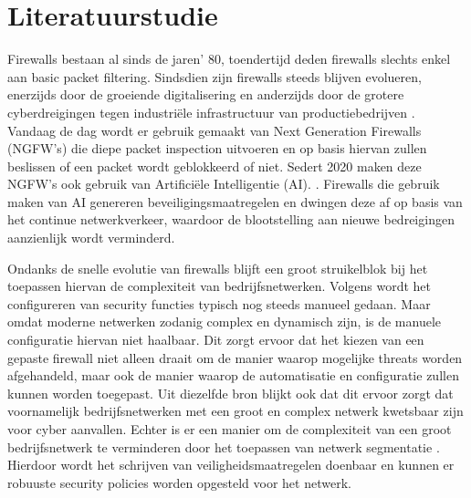 \section{Literatuurstudie}%
\label{sec:literatuurstudie}

Firewalls bestaan al sinds de jaren' 80, toendertijd deden firewalls slechts enkel aan basic packet filtering. Sindsdien zijn firewalls steeds blijven evolueren, enerzijds door de groeiende digitalisering en anderzijds door de grotere cyberdreigingen tegen industriële infrastructuur van productiebedrijven \autocite{Wusteney2021}. Vandaag de dag wordt er gebruik gemaakt van Next Generation Firewalls (NGFW’s) die diepe packet inspection uitvoeren en op basis hiervan zullen beslissen of een packet wordt geblokkeerd of niet. Sedert 2020 maken deze NGFW’s ook gebruik van Artificiële Intelligentie (AI). \autocite{Ahmadi2023}. Firewalls die gebruik maken van AI genereren beveiligingsmaatregelen en dwingen deze af op basis van het continue netwerkverkeer, waardoor de blootstelling aan nieuwe bedreigingen aanzienlijk wordt verminderd. \autocite{PaloAltoFW2024}

Ondanks de snelle evolutie van firewalls blijft een groot struikelblok bij het toepassen hiervan de complexiteit van bedrijfsnetwerken. Volgens \textcite{Bringhenti2023} wordt het configureren van security functies typisch nog steeds manueel gedaan. Maar omdat moderne netwerken zodanig complex en dynamisch zijn, is de manuele configuratie hiervan niet haalbaar. Dit zorgt ervoor dat het kiezen van een gepaste firewall niet alleen draait om de manier waarop mogelijke threats worden afgehandeld, maar ook de manier waarop de automatisatie en configuratie zullen kunnen worden toegepast. Uit diezelfde bron blijkt ook dat dit ervoor zorgt dat voornamelijk bedrijfsnetwerken met een groot en complex netwerk kwetsbaar zijn voor cyber aanvallen. Echter is er een manier om de complexiteit van een groot bedrijfsnetwerk te verminderen door het toepassen van netwerk segmentatie \autocite{Farooq2023}. Hierdoor wordt het schrijven van veiligheidsmaatregelen doenbaar en kunnen er robuuste security policies worden opgesteld voor het netwerk. 

